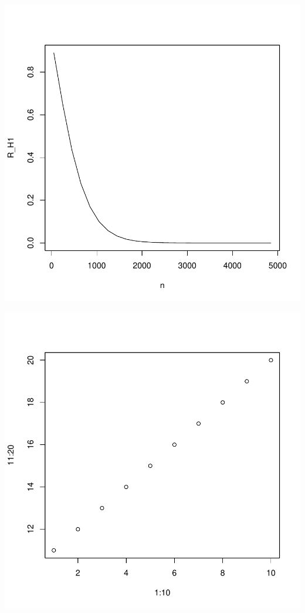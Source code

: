 \documentclass [a4paper]{article}
\begin{document}
\begin{center}
\includegraphics{test-sweave-003}

\end{center}
\begin{center}
\includegraphics{test-sweave-004}
\end{center}
\end{document}
